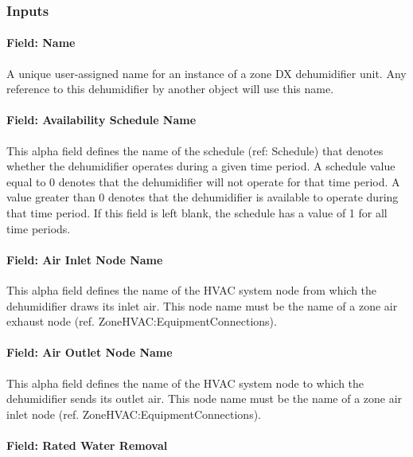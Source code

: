 \subsubsection{Inputs}\label{inputs-12-021}

\paragraph{Field: Name}\label{field-name-12-014}

A unique user-assigned name for an instance of a zone DX dehumidifier unit. Any reference to this dehumidifier by another object will use this name.

\paragraph{Field: Availability Schedule Name}\label{field-availability-schedule-name-11-001}

This alpha field defines the name of the schedule (ref: Schedule) that denotes whether the dehumidifier operates during a given time period. A schedule value equal to 0 denotes that the dehumidifier will not operate for that time period. A value greater than 0 denotes that the dehumidifier is available to operate during that time period. If this field is left blank, the schedule has a value of 1 for all time periods.

\paragraph{Field: Air Inlet Node Name}\label{field-air-inlet-node-name-9-000}

This alpha field defines the name of the HVAC system node from which the dehumidifier draws its inlet air. This node name must be the name of a zone air exhaust node (ref. ZoneHVAC:EquipmentConnections).

\paragraph{Field: Air Outlet Node Name}\label{field-air-outlet-node-name-9-001}

This alpha field defines the name of the HVAC system node to which the dehumidifier sends its outlet air. This node name must be the name of a zone air inlet node (ref. ZoneHVAC:EquipmentConnections).

\paragraph{Field: Rated Water Removal}\label{field-rated-water-removal}

